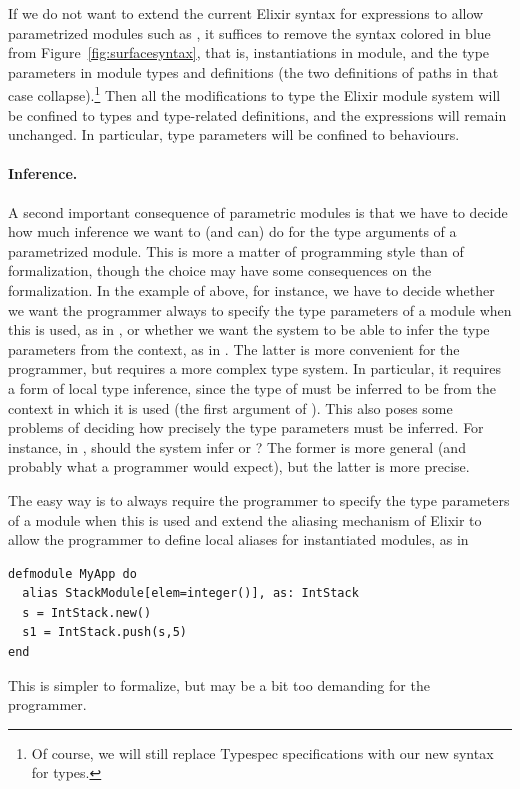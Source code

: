 \documentclass[a4paper,10pt]{article}
\begin{document}
If we do not want to extend the current Elixir syntax for expressions to allow parametrized modules such as , it suffices to remove the syntax colored in blue  from Figure~\ref{fig:surfacesyntax}, that is, instantiations in module, and the type parameters in module types and definitions (the two definitions of paths in that case collapse).\footnote{Of course, we will still replace Typespec specifications with our new syntax for types.} Then all the modifications to type the Elixir module system will be confined to types and type-related definitions, and the expressions will remain unchanged. In particular, type parameters will be confined to behaviours. 


\paragraph{Inference.} A second important consequence of parametric modules is that we have to decide how much inference we want to (and can) do for the type arguments of a parametrized module. This is more a matter of programming style than of formalization, though the choice may have some consequences on the formalization.
In the example of  above, for instance, we have to decide whether we want the programmer always to specify the type parameters of a module when this is used, as in , or whether we want the system to be able to infer the type parameters from the context, as in . The latter is more convenient for the programmer, but requires a more complex type system. In particular, it requires a form of local type inference, since the type of  must be inferred to be  from the context in which it is used (the first argument of ). This also poses some problems of deciding how precisely the type parameters must be inferred. For instance, in , should the system infer  or ? The former is more general (and probably what a programmer would expect), but the latter is more precise.

The easy way is to always require the programmer to specify the type parameters of a module when this is used and extend the aliasing mechanism of Elixir to allow the programmer to define local aliases for instantiated modules, as in
\begin{verbatim}
defmodule MyApp do
  alias StackModule[elem=integer()], as: IntStack
  s = IntStack.new()
  s1 = IntStack.push(s,5)
end
\end{verbatim}
This is simpler to formalize, but may be a bit too demanding for the programmer.
\end{document}
